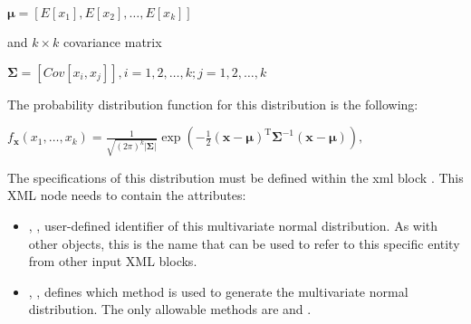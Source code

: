 $\boldsymbol\mu= [E[x_1], E[x_2], …, E[x_k]]$

and $k \times k$ covariance matrix

$\boldsymbol\Sigma = [Cov[x_i,x_j]] , i=1,2,\ldots,k ; j=1,2,\ldots,k$

The probability distribution function for this distribution is the following:

$
f_{\mathbf x}(x_1,\ldots,x_k) =
\frac{1}{\sqrt{(2\pi)^k|\boldsymbol\Sigma|}}
\exp\left(-\frac{1}{2}({\mathbf x}-{\boldsymbol\mu})^\mathrm{T}{\boldsymbol\Sigma}^{-1}({\mathbf x}-{\boldsymbol\mu})
\right),
$

The specifications of this distribution must be defined within the xml block .
This XML node needs to contain the attributes:
\vspace{-5mm}
\begin{itemize}
\itemsep0em
\item {}, , user-defined identifier of this multivariate normal distribution.
%
\nb As with other objects, this is the name that can be used to refer to this specific entity from other input XML blocks.
\item {}, , defines which method is used to generate the multivariate normal distribution.
The only allowable methods are  and .
%
\end{itemize}
\vspace{-5mm}

